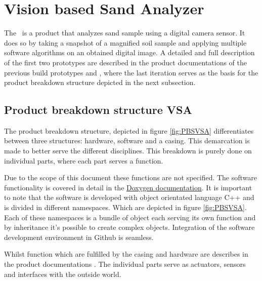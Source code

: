 \documentclass[fleqn,10pt]{SelfArx} %
\begin{document}
\section{Vision based Sand Analyzer}\label{sec:Vision based Sand Analyzer}
The \vsa \ is a product that analyzes sand sample using a digital camera sensor. It does so by taking a snapshot of a magnified soil sample and applying multiple software algorithms on an obtained digital image. A detailed and full description of the first two prototypes are described in the product documentations of the previous build prototypes \cite{jelle_spijker_vision_2015} and \cite{spijker_product_2014}, where the last iteration serves as the basis for the product breakdown structure depicted in the next subsection.

\subsection{Product breakdown structure VSA}
The product breakdown structure, depicted in figure \ref{fig:PBSVSA} differentiates between three structures: hardware, software and a casing. This demarcation is made to better serve the different disciplines. This breakdown is purely done on individual parts, where each part serves a function.

Due to the scope of this document these functions are not specified. The software functionality is covered in detail in the \href{http://peer23peer.github.io/VisionSoilAnalyzer/Doxygen/html/index.html}{\color{color1}Doxygen documentation}. It is important to note that the software is developed with object orientated language C++ and is divided in different namespaces. Which are depicted in figure \ref{fig:PBSVSA}. Each of these namespaces is a bundle of object each serving its own function and by inheritance it's possible to create complex objects. Integration of the software development environment in Github is seamless.

Whilst function which are fulfilled by the casing and hardware are describes in the product documentations \cite{jelle_spijker_vision_2015}. The individual parts serve as actuators, sensors and interfaces with the outside world.  
\end{document}
